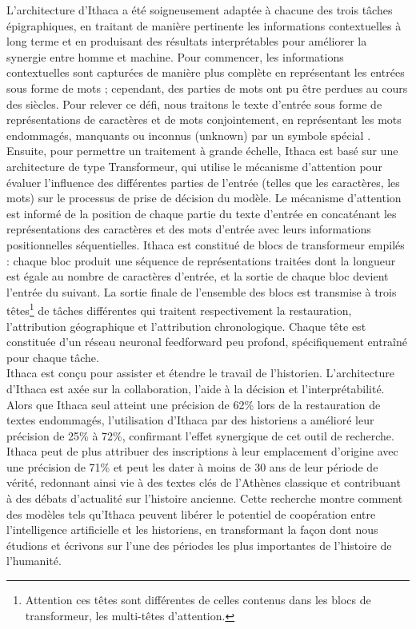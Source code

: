 \documentclass[12pt, french, twoside]{report}
\begin{document}
L'architecture d'Ithaca a été soigneusement adaptée à chacune des trois tâches épigraphiques, en traitant de manière pertinente les informations contextuelles à long terme et en produisant des résultats interprétables pour améliorer la synergie entre homme et machine. Pour commencer, les informations contextuelles sont capturées de manière plus complète en représentant les entrées sous forme de mots ; cependant, des parties de mots ont pu être perdues au cours des siècles. Pour relever ce défi, nous traitons le texte d'entrée sous forme de représentations de caractères et de mots conjointement, en représentant les mots endommagés, manquants ou inconnus (unknown) par un symbole spécial \og [unk]\fg.\\ 

Ensuite, pour permettre un traitement à grande échelle, Ithaca est basé sur une architecture de type Transformeur, qui utilise le mécanisme d'attention pour évaluer l'influence des différentes parties de l'entrée (telles que les caractères, les mots) sur le processus de prise de décision du modèle. Le mécanisme d'attention est informé de la position de chaque partie du texte d'entrée en concaténant les représentations des caractères et des mots d'entrée avec leurs informations positionnelles séquentielles. Ithaca est constitué de blocs de transformeur empilés : chaque bloc produit une séquence de représentations traitées dont la longueur est égale au nombre de caractères d'entrée, et la sortie de chaque bloc devient l'entrée du suivant. La sortie finale de l'ensemble des blocs est transmise à trois têtes\footnote{Attention ces têtes sont différentes de celles contenus dans les blocs de transformeur, les multi-têtes d'attention.} de tâches différentes qui traitent respectivement la restauration, l'attribution géographique et l'attribution chronologique. Chaque tête est constituée d'un réseau neuronal feedforward peu profond, spécifiquement entraîné pour chaque tâche.\\

Ithaca est conçu pour assister et étendre le travail de l'historien. L'architecture d'Ithaca est axée sur la collaboration, l'aide à la décision et l'interprétabilité. Alors que Ithaca seul atteint une précision de 62\% lors de la restauration de textes endommagés, l'utilisation d'Ithaca par des historiens a amélioré leur précision de 25\% à 72\%, confirmant l'effet synergique de cet outil de recherche. Ithaca peut de plus attribuer des inscriptions à leur emplacement d'origine avec une précision de 71\% et peut les dater à moins de 30 ans de leur période de vérité, redonnant ainsi vie à des textes clés de l'Athènes classique et contribuant à des débats d'actualité sur l'histoire ancienne. Cette recherche montre comment des modèles tels qu'Ithaca peuvent libérer le potentiel de coopération entre l'intelligence artificielle et les historiens, en transformant la façon dont nous étudions et écrivons sur l'une des périodes les plus importantes de l'histoire de l'humanité.\\
\end{document}
